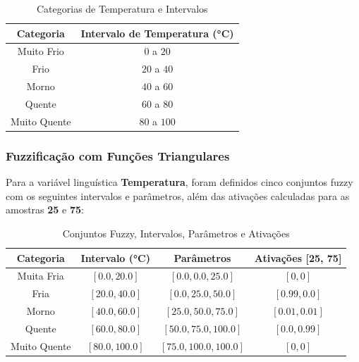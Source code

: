 \documentclass[a4paper,12pt]{article}
\begin{document}
\begin{table}[H]
\centering
\caption{Categorias de Temperatura e Intervalos}
\label{tab:categorias_temperatura}
\begin{tabular}{|c|c|}
\hline
\textbf{Categoria}    & \textbf{Intervalo de Temperatura (°C)} \\ \hline
Muito Frio            & $0$ a $20$                            \\ \hline
Frio                  & $20$ a $40$                           \\ \hline
Morno                 & $40$ a $60$                           \\ \hline
Quente                & $60$ a $80$                           \\ \hline
Muito Quente          & $80$ a $100$                          \\ \hline
\end{tabular}
\end{table}

\subsubsection{Fuzzificação com Funções Triangulares}

Para a variável linguística \textbf{Temperatura}, foram definidos cinco conjuntos fuzzy com os seguintes intervalos e parâmetros, além das ativações calculadas para as amostras \textbf{25} e \textbf{75}:

\begin{table}[H]
\centering
\caption{Conjuntos Fuzzy, Intervalos, Parâmetros e Ativações}
\begin{tabular}{|c|c|c|c|}
\hline
\textbf{Categoria}    & \textbf{Intervalo (°C)} & \textbf{Parâmetros}       & \textbf{Ativações [25, 75]} \\ \hline
Muita Fria            & $[0.0, 20.0]$          & $[0.0, 0.0, 25.0]$        & $[0, 0]$                   \\ \hline
Fria                  & $[20.0, 40.0]$         & $[0.0, 25.0, 50.0]$       & $[0.99, 0.0]$              \\ \hline
Morno                 & $[40.0, 60.0]$         & $[25.0, 50.0, 75.0]$      & $[0.01, 0.01]$             \\ \hline
Quente                & $[60.0, 80.0]$         & $[50.0, 75.0, 100.0]$     & $[0.0, 0.99]$              \\ \hline
Muito Quente          & $[80.0, 100.0]$        & $[75.0, 100.0, 100.0]$    & $[0, 0]$                   \\ \hline
\end{tabular}
\end{table}
\end{document}
